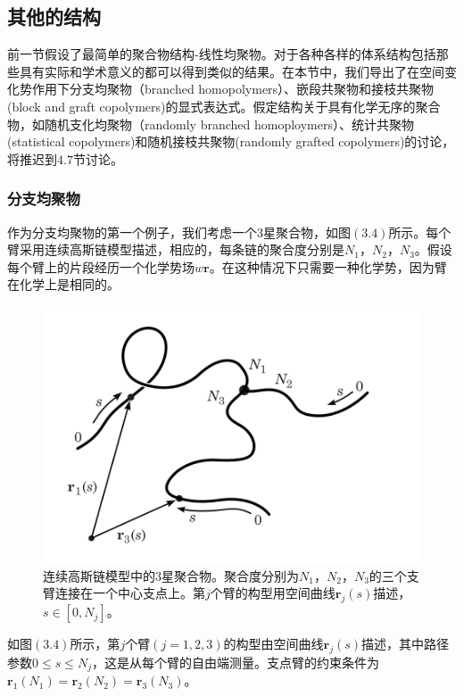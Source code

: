 \subsection{其他的结构}
前一节假设了最简单的聚合物结构-线性均聚物。对于各种各样的体系结构包括那些具有实际和学术意义的都可以得到类似的结果。在本节中，我们导出了在空间变化势作用下分支均聚物（branched homopolymers）、嵌段共聚物和接枝共聚物(block and graft copolymers)的显式表达式。假定结构关于具有化学无序的聚合物，如随机支化均聚物（randomly branched homoploymers）、统计共聚物(statistical copolymers)和随机接枝共聚物(randomly grafted copolymers)的讨论，将推迟到$4.7$节讨论。
\subsubsection{分支均聚物}
作为分支均聚物的第一个例子，我们考虑一个$3$星聚合物，如图$(3.4)$所示。每个臂采用连续高斯链模型描述，相应的，每条链的聚合度分别是$N_1$，$N_2$，$N_3$。假设每个臂上的片段经历一个化学势场$w \mathbf{r}$。在这种情况下只需要一种化学势，因为臂在化学上是相同的。
\begin{figure}[H]
\centering
\includegraphics[scale=0.7]{./figures/34.png}
\caption{连续高斯链模型中的$3$星聚合物。聚合度分别为$N_1$，$N_2$，$N_3$的三个支臂连接在一个中心支点上。第$j$个臂的构型用空间曲线$\mathbf{r}_j(s)$描述，$s\in [0,N_j]$。}
\end{figure}

如图$(3.4)$所示，第$j$个臂$(j=1,2,3)$的构型由空间曲线$\mathbf{r}_j(s)$描述，其中路径参数$0\leq s\leq N_j$，这是从每个臂的自由端测量。支点臂的约束条件为$\mathbf{r}_1(N_1)=\mathbf{r}_2(N_2)=\mathbf{r}_3(N_3)$。

